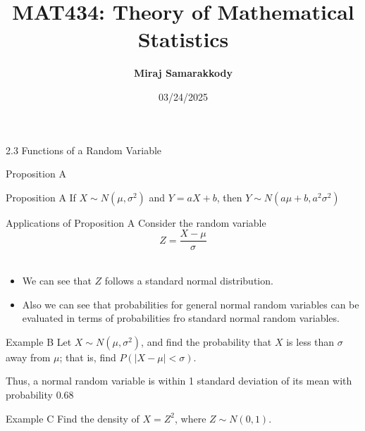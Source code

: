 \documentclass{beamer}
\title{MAT434: Theory of Mathematical Statistics}
\author{\textbf{Miraj Samarakkody}}
\institute{Tougaloo College}
\date{03/24/2025}
\begin{document}
\begin{frame}
    \titlepage
\end{frame}



\begin{frame}{}
    \begin{center}
        \Huge{2.3 Functions of a Random Variable}
    \end{center}

\end{frame}





\begin{frame}{Proposition A}
\begin{block}{Proposition A}    
If \(X \sim N(\mu, \sigma^2)\) and \(Y=aX+b\), then \(Y\sim N(a\mu +b, a^2\sigma^2)\)
\end{block}
\end{frame}

\begin{frame}{Applications of Proposition A}
Consider the random variable \[Z=\dfrac{X-\mu}{\sigma}\]\\ \pause 


\begin{itemize}
    \item We can see that \(Z\) follows a standard normal distribution. \\\pause


    \item Also we can see that probabilities for general normal random variables can be evaluated in terms of probabilities fro standard normal random variables. 
\end{itemize} 
\end{frame}




\begin{frame}{Example B}
Let \(X \sim N (\mu, \sigma^2)\), and find the probability that \(X\) is less than \(\sigma\) away from \(\mu\); that is, find \(P(|X-\mu|< \sigma)\).\\ \pause
\vspace{0.2in}

Thus, a normal random variable is within 1 standard deviation of its mean with probability \(0.68\)
\end{frame}

\begin{frame}{Example C}
    Find the density of \(X=Z^2\), where \(Z \sim N(0,1)\). \\
    \vspace{0.2in}
    
\end{frame}
\end{document}
